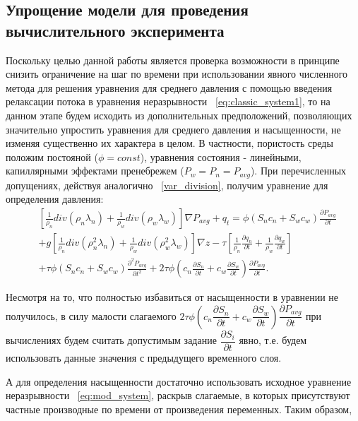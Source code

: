 \subsection{Упрощение модели для проведения вычислительного эксперимента}

Поскольку целью данной работы является проверка возможности в принципе снизить ограничение на шаг по времени при
использовании явного численного метода для решения уравнения для среднего давления
с помощью введения релаксации потока в уравнения неразрывности ~\eqref{eq:classic_system1}, то на данном этапе
будем исходить из дополнительных предположений, позволяющих значительно упростить уравнения для среднего давления
и насыщенности, не изменяя существенно их характера в целом. В частности, пористость среды положим постояной ($\phi = const$),
уравнения состояния - линейными, капиллярными эффектами пренебрежем ($P_w = P_n = P_{avg}$).
При перечисленных допущениях, действуя аналогично ~\ref{var_division}, получим уравнение для определения давления:
\begin{equation} \label{eq:mod_pressure}
 \begin{aligned}
  &\left[ \frac{1}{\rho_n} div (\rho_n\lambda_n) + \frac{1}{\rho_w} div (\rho_w\lambda_w) \right] \nabla P_{avg}
  + q_t = \phi (S_n c_n + S_w c_w) \frac{\partial P_{avg}}{\partial t} \\
  & + g \left[ \frac{1}{\rho_n} div (\rho_n^2\lambda_n) + \frac{1}{\rho_w} div (\rho_w^2\lambda_w) \right] \nabla z
  - \tau \left[ \frac{1}{\rho_n} \frac{\partial q_n}{\partial t} + \frac{1}{\rho_w} \frac{\partial q_w}{\partial t} \right] \\
  & + \tau \phi (S_n c_n + S_w c_w) \frac{\partial^2 P_{avg}}{\partial t^2}
  + 2 \tau \phi (c_n \frac{\partial S_n}{\partial t} + c_w\frac{\partial S_w}{\partial t}) \frac{\partial P_{avg}}{\partial t}.
 \end{aligned}
\end{equation}

Несмотря на то, что полностью избавиться от насыщенности в уравнении не получилось, в силу малости слагаемого
$2 \tau \phi (c_n \dfrac{\partial S_n}{\partial t} + c_w\dfrac{\partial S_w}{\partial t}) \dfrac{\partial P_{avg}}{\partial t}$
при вычислениях будем считать допустимым задание $\dfrac{\partial S_i}{\partial t}$ явно, т.е. будем использовать данные
значения с предыдущего временного слоя.

А для определения насыщенности достаточно использовать исходное уравнение неразрывности ~\eqref{eq:mod_system},
раскрыв слагаемые, в которых присутствуют частные производные по времени от произведения переменных. Таким образом,

